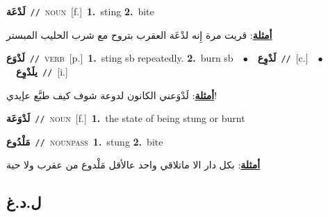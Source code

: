 \documentclass[10pt,a4paper,twoside]{article} %
\begin{document}
\begin{multicols}{2}
{\setlength\topsep{0pt}\textbf{\foreignlanguage{arabic}{لَدْعَة}}\ {\color{gray}\texttt{//}\color{black}}\ \textsc{noun}\ [f.]\ \textbf{1.}~sting  \textbf{2.}~bite\  \begin{flushright}\color{gray}\foreignlanguage{arabic}{\textbf{\underline{\foreignlanguage{arabic}{أمثلة}}}: قريت مرة إِنه لدْعَة العقرب بتروح مع شرب الحليب المبستر}\end{flushright}\color{black}} \vspace{2mm}

{\setlength\topsep{0pt}\textbf{\foreignlanguage{arabic}{لَدْوَع}}\ {\color{gray}\texttt{//}\color{black}}\ \textsc{verb}\ [p.]\ \textbf{1.}~sting sb repeatedly.  \textbf{2.}~burn sb\ \ $\bullet$\ \ \setlength\topsep{0pt}\textbf{\foreignlanguage{arabic}{لَدْوِع}}\ {\color{gray}\texttt{//}\color{black}}\ [c.]\ \ $\bullet$\ \ \setlength\topsep{0pt}\textbf{\foreignlanguage{arabic}{يلَدْوِع}}\ {\color{gray}\texttt{//}\color{black}}\ [i.]\  \begin{flushright}\color{gray}\foreignlanguage{arabic}{\textbf{\underline{\foreignlanguage{arabic}{أمثلة}}}: لَدْوَعني الكانون لدوعة شوف كيف طبَّع عإيدي!}\end{flushright}\color{black}} \vspace{2mm}

{\setlength\topsep{0pt}\textbf{\foreignlanguage{arabic}{لَدْوَعَة}}\ {\color{gray}\texttt{//}\color{black}}\ \textsc{noun}\ [f.]\ \textbf{1.}~the state of being stung or burnt\ } \vspace{2mm}

{\setlength\topsep{0pt}\textbf{\foreignlanguage{arabic}{مَلْدُوع}}\ {\color{gray}\texttt{//}\color{black}}\ \textsc{noun\textunderscore pass}\ \textbf{1.}~stung  \textbf{2.}~bite\  \begin{flushright}\color{gray}\foreignlanguage{arabic}{\textbf{\underline{\foreignlanguage{arabic}{أمثلة}}}: بكل دار الا ماتلاقي واحد عالأقل مَلْدوع من عقرب ولا حية}\end{flushright}\color{black}} \vspace{2mm}

\vspace{-3mm}
\subsection*{\color{blue}\foreignlanguage{arabic}{ل.د.غ}\color{blue}{}} 


\end{multicols}
\end{document}
